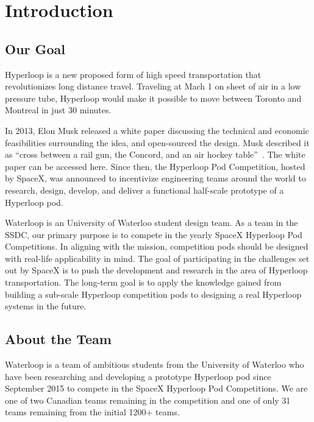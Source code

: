 \documentclass[11pt,a4paper,oldfontcommands]{memoir}
\begin{document}
\clearpage


\chapter{Introduction}

\section{Our Goal}
Hyperloop is a new proposed form of high speed transportation that revolutionizes long distance travel. Traveling at Mach 1 on sheet of air in a low pressure tube, Hyperloop would make it possible to move between Toronto and Montreal in just 30 minutes.

In 2013, Elon Musk released a white paper discussing the technical and economic feasibilities surrounding the idea, and open-sourced the design. Musk described it as “cross between a rail gun, the Concord, and an air hockey table”~\cite{Concorde_and_airhockey}. The white paper can be accessed here. Since then, the Hyperloop Pod Competition, hosted by SpaceX, was announced to incentivize engineering teams around the world to research, design, develop, and deliver a functional half-scale prototype of a Hyperloop pod.

Waterloop is an University of Waterloo student design team. As a team in the SSDC, our primary purpose is to compete in the yearly SpaceX Hyperloop Pod Competitions. In aligning with the mission, competition pods should be designed with real-life applicability in mind. The goal of participating in the challenges set out by SpaceX is to push the development and research in the area of Hyperloop transportation. The long-term goal is to apply the knowledge gained from building a sub-scale Hyperloop competition pods to designing a real Hyperloop systems in the future.

\section{About the Team}
Waterloop is a team of ambitious students from the University of Waterloo who have been researching and developing a prototype Hyperloop pod since September 2015 to compete in the SpaceX Hyperloop Pod Competitions. We are one of two Canadian teams remaining in the competition and one of only 31 teams remaining from the initial 1200+ teams.
\end{document}
